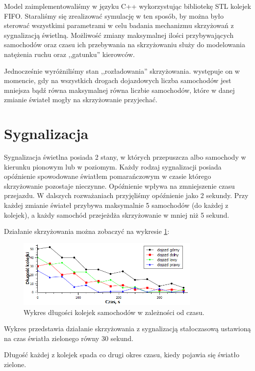 \documentclass[11pt]{aghdpl}
\begin{document}
Model zaimplementowaliśmy w języku C++ wykorzystując bibliotekę STL kolejek FIFO. Staraliśmy się zrealizować symulację w ten sposób, by można było sterować wszystkimi parametrami w celu badania mechanizmu skrzyżowań z sygnalizacją świetlną. Możliwość zmiany maksymalnej ilości przybywających samochodów oraz czasu ich przebywania na skrzyżowaniu służy do modelowania natężenia ruchu oraz ,,gatunku'' kierowców.

Jednocześnie wyróżniliśmy stan ,,rozładowania'' skrzyżowania. występuje on w momencie, gdy na wszystkich drogach dojazdowych liczba samochodów jest mniejsza bądź równa maksymalnej równa liczbie samochodów, które w danej zmianie świateł mogły na skrzyżowanie przyjechać.

\section{Sygnalizacja}
Sygnalizacja świetlna posiada 2 stany, w których przepuszcza albo samochody w kierunku pionowym lub w poziomym. Każdy rodzaj sygnalizacji posiada opóźnienie spowodowane światłem pomarańczowym w czasie którego skrzyżowanie pozostaje nieczynne. Opóźnienie wpływa na zmniejszenie czasu przejazdu. W dalszych rozważaniach przyjęliśmy opóźnienie jako 2 sekundy.
Przy każdej zmianie świateł przybywa maksymalnie 5 samochodów (do każdej z kolejek), a każdy samochód przejeżdża skrzyżowanie w mniej niż 5 sekund.

Działanie skrzyżowania można zobaczyć na wykresie \ref{dzialanie}:
\begin{figure}[h!]
	\centering
	\includegraphics[width=0.80\textwidth]{dzialanie.png}
	\caption{Wykres długości kolejek samochodów w zależności od czasu.}	
	\label{dzialanie}
\end{figure}

Wykres przedstawia działanie skrzyżowania z sygnalizacją stałoczasową ustawioną na czas światła zielonego równy 30 sekund. 

Długość każdej z kolejek spada co drugi okres czasu, kiedy pojawia się światło zielone. 
\end{document}
